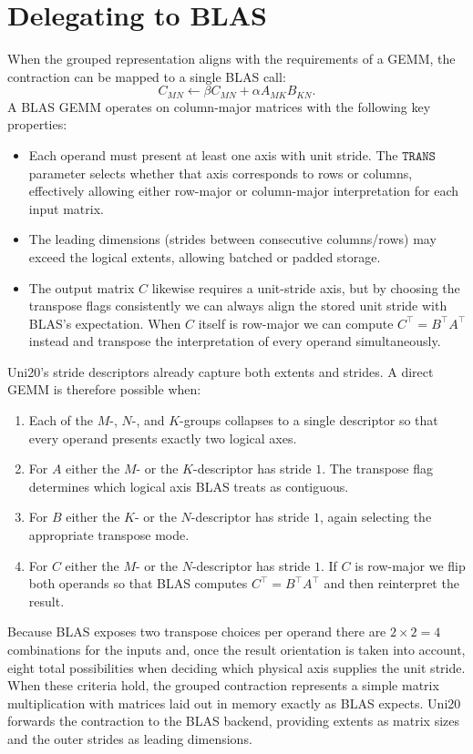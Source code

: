\documentclass[11pt]{article}
\begin{document}
\section{Delegating to BLAS}
When the grouped representation aligns with the requirements of a GEMM, the contraction can be
mapped to a single BLAS call:
\begin{equation}
  C_{MN} \gets \beta C_{MN} + \alpha A_{MK} B_{KN}.
\end{equation}
A BLAS GEMM operates on column-major matrices with the following key properties:
\begin{itemize}
  \item Each operand must present at least one axis with unit stride.  The $\texttt{TRANS}$
        parameter selects whether that axis corresponds to rows or columns, effectively allowing
        either row-major or column-major interpretation for each input matrix.
  \item The leading dimensions (strides between consecutive columns/rows) may exceed the logical
        extents, allowing batched or padded storage.
  \item The output matrix $C$ likewise requires a unit-stride axis, but by choosing the transpose
        flags consistently we can always align the stored unit stride with BLAS's expectation.  When
        $C$ itself is row-major we can compute $C^\top = B^\top A^\top$ instead and transpose the
        interpretation of every operand simultaneously.
\end{itemize}
Uni20's stride descriptors already capture both extents and strides.  A direct GEMM is therefore
possible when:
\begin{enumerate}
  \item Each of the $M$-, $N$-, and $K$-groups collapses to a single descriptor so that every
        operand presents exactly two logical axes.
  \item For $A$ either the $M$- or the $K$-descriptor has stride $1$.  The transpose flag determines
        which logical axis BLAS treats as contiguous.
  \item For $B$ either the $K$- or the $N$-descriptor has stride $1$, again selecting the appropriate
        transpose mode.
  \item For $C$ either the $M$- or the $N$-descriptor has stride $1$.  If $C$ is row-major we flip
        both operands so that BLAS computes $C^\top = B^\top A^\top$ and then reinterpret the result.
\end{enumerate}
Because BLAS exposes two transpose choices per operand there are $2\times2=4$ combinations for the
inputs and, once the result orientation is taken into account, eight total possibilities when
deciding which physical axis supplies the unit stride.  When these criteria hold, the grouped
contraction represents a simple matrix multiplication with
matrices laid out in memory exactly as BLAS expects.  Uni20 forwards the contraction to the BLAS
backend, providing extents as matrix sizes and the outer strides as leading dimensions.
\end{document}
